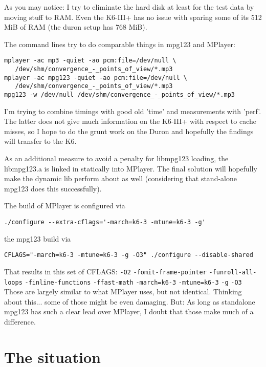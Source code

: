 \documentclass[a4paper,12pt]{scrartcl}
\begin{document}
As you may notice: I try to eliminate the hard disk at least for the test data by moving stuff to RAM. Even the K6-III+ has no issue with sparing some of its 512 MiB of RAM (the duron setup has 768 MiB).

The command lines try to do comparable things in mpg123 and MPlayer:

\begin{verbatim}
mplayer -ac mp3 -quiet -ao pcm:file=/dev/null \
   /dev/shm/convergence_-_points_of_view/*.mp3
mplayer -ac mpg123 -quiet -ao pcm:file=/dev/null \
   /dev/shm/convergence_-_points_of_view/*.mp3
mpg123 -w /dev/null /dev/shm/convergence_-_points_of_view/*.mp3
\end{verbatim}

I'm trying to combine timings with good old 'time' and measurements with 'perf'. The latter does not give much information on the K6-III+ with respect to cache misses, so I hope to do the grunt work on the Duron and hopefully the findings will transfer to the K6.

As an additional measure to avoid a penalty for libmpg123 loading, the libmpg123.a is linked in statically into MPlayer. The final solution will hopefully make the dynamic lib perform about as well (considering that stand-alone mpg123 does this successfully).

The build of MPlayer is configured via
\begin{verbatim}
./configure --extra-cflags='-march=k6-3 -mtune=k6-3 -g'
\end{verbatim}
the mpg123 build via
\begin{verbatim}
CFLAGS="-march=k6-3 -mtune=k6-3 -g -O3" ./configure --disable-shared
\end{verbatim}

That results in this set of CFLAGS: \verb:-O2: \verb:-fomit-frame-pointer: \verb:-funroll-all-loops: \verb:-finline-functions: \verb:-ffast-math:  \verb:-march=k6-3: \verb:-mtune=k6-3: \verb:-g: \verb:-O3:
Those are largely similar to what MPlayer uses, but not identical. Thinking about this... some of those might be even damaging. But: As long as standalone mpg123 has such a clear lead over MPlayer, I doubt that those make much of a difference.


\section{The situation}
\end{document}
